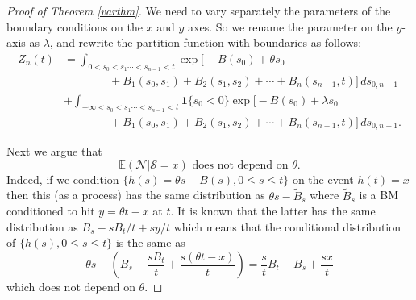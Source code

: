 \documentclass[11pt]{amsart}
\numberwithin{equation}{section}
\theoremstyle{remark}
\begin{document}
\begin{proof}[Proof of Theorem \ref{varthm}]
We need to vary separately the parameters of the boundary conditions
on the $x$ and $y$ axes.  So we rename the parameter on the
$y$-axis as ${\lambda}$, and rewrite the partition function with
boundaries 
as follows:
\begin{equation}\begin{aligned} Z_{n}(t) &= 
\int_{0<s_{0}<s_1\dotsm<s_{n-1}<t}  \exp\bigl[ -B(s_0)+{\theta} s_0 \\[7pt]
 &\qquad\qquad   +  B_1(s_0,s_1) 
+B_{2}(s_1,s_{2}) +\dotsm + B_n(s_{n-1},t)\bigr] \,ds_{0,n-1}\\
&
+ 
\int_{-\infty<s_{0}<s_1\dotsm<s_{n-1}<t} {\mathbf{1}}\{s_0<0\} 
 \exp\bigl[ -B(s_0)+{\lambda} s_0 \\[7pt]
 &\qquad \qquad +  B_1(s_0,s_1) 
+B_{2}(s_1,s_{2}) +\dotsm + B_n(s_{n-1},t)\bigr] \,ds_{0,n-1}.
\end{aligned}\label{Z5}\end{equation}

Next we argue that 
\begin{equation} \text{${\mathbb{E}}({{\mathcal N}}\vert{{\mathcal S}}=x)$ does not
depend on ${\theta}$.}  \label{aux3.8}\end{equation}
Indeed, if we condition $\{h(s)={\theta} s-B(s), 0\le s\le t\}$ on the event $h(t)=x$ then this (as a process) has the same distribution as ${\theta} s-\tilde B_s$ where $\tilde B_s$ is a BM conditioned to hit $y={\theta} t-x$ at $t$. It is known that the latter has the same distribution as $B_s-sB_t/t  +{sy}/{t}$ which means that the conditional distribution of $\{h(s), 0\le s\le t\}$ is the same as
\[
{\theta} s-\left(B_s- \frac{sB_t}{t}+\frac{s({\theta} t-x)}{t}\right)=\frac{s}{t} B_t-B_s+\frac{sx}{t}
\]
which does not depend on ${\theta}$. 


\end{proof}
\end{document}

